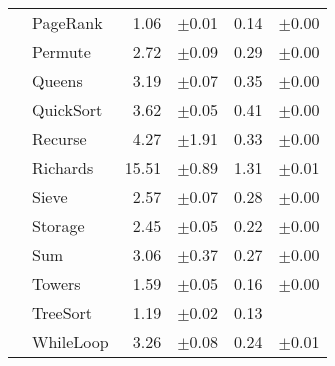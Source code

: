 \begin{tabular}{llrlrl}
 & PageRank & 1.06 & \scriptsize\textcolor{gray!60}{$\pm$0.01} & 0.14 & \scriptsize\textcolor{gray!60}{$\pm$0.00} \\
 & Permute & 2.72 & \scriptsize\textcolor{gray!60}{$\pm$0.09} & 0.29 & \scriptsize\textcolor{gray!60}{$\pm$0.00} \\
 & Queens & 3.19 & \scriptsize\textcolor{gray!60}{$\pm$0.07} & 0.35 & \scriptsize\textcolor{gray!60}{$\pm$0.00} \\
 & QuickSort & 3.62 & \scriptsize\textcolor{gray!60}{$\pm$0.05} & 0.41 & \scriptsize\textcolor{gray!60}{$\pm$0.00} \\
 & Recurse & 4.27 & \scriptsize\textcolor{gray!60}{$\pm$1.91} & 0.33 & \scriptsize\textcolor{gray!60}{$\pm$0.00} \\
 & Richards & 15.51 & \scriptsize\textcolor{gray!60}{$\pm$0.89} & 1.31 & \scriptsize\textcolor{gray!60}{$\pm$0.01} \\
 & Sieve & 2.57 & \scriptsize\textcolor{gray!60}{$\pm$0.07} & 0.28 & \scriptsize\textcolor{gray!60}{$\pm$0.00} \\
 & Storage & 2.45 & \scriptsize\textcolor{gray!60}{$\pm$0.05} & 0.22 & \scriptsize\textcolor{gray!60}{$\pm$0.00} \\
 & Sum & 3.06 & \scriptsize\textcolor{gray!60}{$\pm$0.37} & 0.27 & \scriptsize\textcolor{gray!60}{$\pm$0.00} \\
 & Towers & 1.59 & \scriptsize\textcolor{gray!60}{$\pm$0.05} & 0.16 & \scriptsize\textcolor{gray!60}{$\pm$0.00} \\
 & TreeSort & 1.19 & \scriptsize\textcolor{gray!60}{$\pm$0.02} & 0.13 &  \\
 & WhileLoop & 3.26 & \scriptsize\textcolor{gray!60}{$\pm$0.08} & 0.24 & \scriptsize\textcolor{gray!60}{$\pm$0.01} \\
\bottomrule
\end{tabular}
